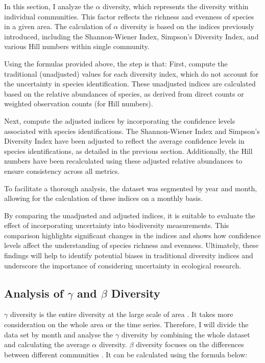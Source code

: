 \documentclass[a4paper,12pt]{article}
\begin{document}
In this section, I analyze the $\alpha$ diversity, which represents the diversity within individual communities. This factor reflects the richness and evenness of species in a given area. The calculation of $\alpha$ diversity is based on the indices previously introduced, including the Shannon-Wiener Index, Simpson's Diversity Index, and various Hill numbers within single community. 

Using the formulas provided above, the step is that: First, compute the traditional (unadjusted) values for each diversity index, which do not account for the uncertainty in species identification. These unadjusted indices are calculated based on the relative abundances of species, as derived from direct counts or weighted observation counts (for Hill numbers).

Next, compute the adjusted indices by incorporating the confidence levels associated with species identifications. The Shannon-Wiener Index and Simpson's Diversity Index have been adjusted to reflect the average confidence levels in species identifications, as detailed in the previous section. Additionally, the Hill numbers have been recalculated using these adjusted relative abundances to ensure consistency across all metrics.

To facilitate a thorough analysis, the dataset was segmented by year and month, allowing for the calculation of these indices on a monthly basis.

By comparing the unadjusted and adjusted indices, it is suitable to evaluate the effect of incorporating uncertainty into biodiversity measurements. This comparison highlights significant changes in the indices and shows how confidence levels affect the understanding of species richness and evenness. Ultimately, these findings will help to identify potential biases in traditional diversity indices and underscore the importance of considering uncertainty in ecological research.



\subsection{Analysis of $\gamma$ and $\beta$ Diversity}
$\gamma$ diversity is the entire diversity at the large scale of area \citep{jost2007partitioning}. It takes more consideration on the whole area or the time series. Therefore, I will divide the data set by month and analyse the $\gamma$ diversity by combining the whole dataset and calculating the average $\alpha$ diversity. $\beta$ diversity focuses on the differences between different communities \citep{jost2010independence}. It can be calculated using the formula below:
\end{document}
